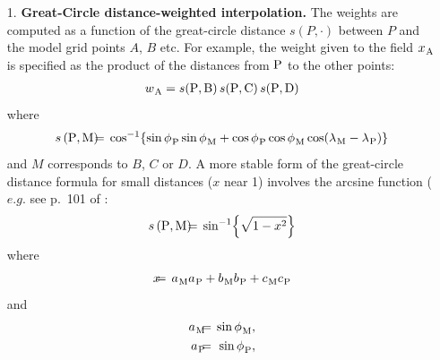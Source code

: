 \begin{enumerate}

\item[1.] {\bf Great-Circle distance-weighted interpolation.} The weights
  are computed as a function of the great-circle distance $s(P, \cdot)$ 
  between $P$ and the model grid points $A$, $B$ etc. For example, 
  the weight given to the field ${x_{}}_{\rm A}$ is specified as the 
  product of the distances from ${\rm P}$ to the other points:
  \begin{eqnarray}
  {w_{}}_{\rm A} = s({\rm P}, {\rm B}) \, s({\rm P}, {\rm C}) \, s({\rm P}, {\rm D})
  \nonumber
  \end{eqnarray}
  where 
  \begin{eqnarray}
   s\left ({\rm P}, {\rm M} \right ) 
     & \hspace{-2mm} = \hspace{-2mm} & 
      \cos^{-1} \! \left\{ 
               \sin {\phi_{}}_{\rm P} \sin {\phi_{}}_{\rm M}
             + \cos {\phi_{}}_{\rm P} \cos {\phi_{}}_{\rm M} 
               \cos ({\lambda_{}}_{\rm M} - {\lambda_{}}_{\rm P}) 
                   \right\}
   \end{eqnarray}
   and $M$ corresponds to $B$, $C$ or $D$.
   A more stable form of the great-circle distance formula for
   small distances ($x$ near 1) involves the arcsine function
   ($e.g.$ see p.~101 of \citet{Daley_Barker_Bk01}:
   \begin{eqnarray}
   s\left( {\rm P}, {\rm M} \right) 
     & \hspace{-2mm} = \hspace{-2mm} & 
      \sin^{-1} \! \left\{ \sqrt{ 1 - x^2 } \right\}
   \nonumber
   \end{eqnarray}
   where
   \begin{eqnarray}
    x & \hspace{-2mm} = \hspace{-2mm} & 
      {a_{}}_{\rm M} {a_{}}_{\rm P} + {b_{}}_{\rm M} {b_{}}_{\rm P} + {c_{}}_{\rm M} {c_{}}_{\rm P}
   \nonumber
   \end{eqnarray}
   and 
   \begin{eqnarray}
      {a_{}}_{\rm M} & \hspace{-2mm} = \hspace{-2mm} & \sin {\phi_{}}_{\rm M}, 
      \nonumber \\
      {a_{}}_{\rm P} & \hspace{-2mm} = \hspace{-2mm} & \sin {\phi_{}}_{\rm P}, 
      \nonumber \\

\end{eqnarray}
\end{enumerate}
